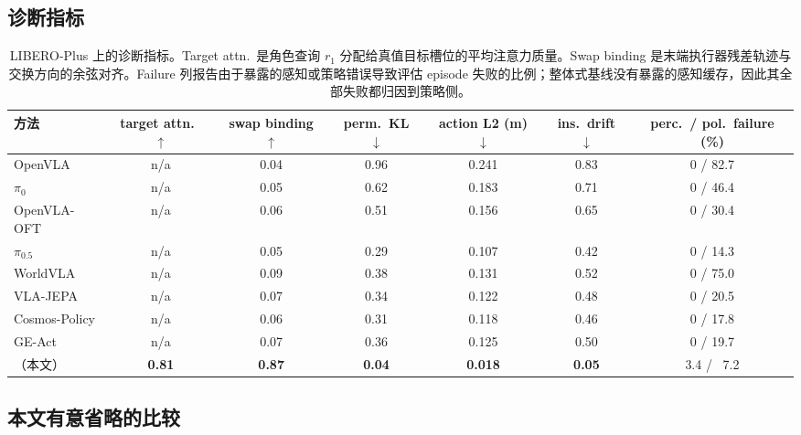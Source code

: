 \subsection*{诊断指标}

\begin{table}[!ht]
  \caption{LIBERO-Plus 上的诊断指标。Target attn.\ 是角色查询 $r_1$ 分配给真值目标槽位的平均注意力质量。Swap binding 是末端执行器残差轨迹与交换方向的余弦对齐。Failure 列报告由于暴露的感知或策略错误导致评估 episode 失败的比例；整体式基线没有暴露的感知缓存，因此其全部失败都归因到策略侧。}
  \label{tab:diagnostics}
  \centering
  \scriptsize
  \setlength{\tabcolsep}{4pt}
  \begin{tabular}{lcccccc}
    \toprule
    方法 & target attn.\ $\uparrow$ & swap binding $\uparrow$ & perm.\ KL $\downarrow$ & action L2 (m) $\downarrow$ & ins.\ drift $\downarrow$ & perc.\ / pol.\ failure (\%) \\
    \midrule
    OpenVLA           & n/a  & 0.04 & 0.96 & 0.241 & 0.83 & 0 / 82.7 \\
    $\pi_0$           & n/a  & 0.05 & 0.62 & 0.183 & 0.71 & 0 / 46.4 \\
    OpenVLA-OFT       & n/a  & 0.06 & 0.51 & 0.156 & 0.65 & 0 / 30.4 \\
    $\pi_{0.5}$       & n/a  & 0.05 & 0.29 & 0.107 & 0.42 & 0 / 14.3 \\
    WorldVLA          & n/a  & 0.09 & 0.38 & 0.131 & 0.52 & 0 / 75.0 \\
    VLA-JEPA          & n/a  & 0.07 & 0.34 & 0.122 & 0.48 & 0 / 20.5 \\
    Cosmos-Policy     & n/a  & 0.06 & 0.31 & 0.118 & 0.46 & 0 / 17.8 \\
    GE-Act            & n/a  & 0.07 & 0.36 & 0.125 & 0.50 & 0 / 19.7 \\
    \method{}（本文）  & \textbf{0.81} & \textbf{0.87} & \textbf{0.04} & \textbf{0.018} & \textbf{0.05} & 3.4 / ~7.2 \\
    \bottomrule
  \end{tabular}
\end{table}

\subsection*{本文有意省略的比较}

